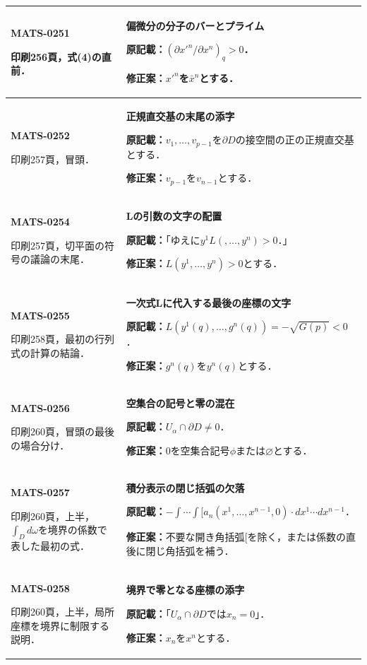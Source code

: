 \documentclass[a4paper,10pt]{ltjsarticle}
\begin{document}
\begin{longtable}{@{}>{\raggedright\arraybackslash}p{.19\linewidth}>{\raggedright\arraybackslash}p{.77\linewidth}@{}}
\hline
\hypertarget{MATS-0251}{}\textbf{MATS-0251}\par 印刷256頁，式(4)の直前． & \textbf{偏微分の分子のバーとプライム}\par\textbf{原記載：}$(\partial x'^n/\partial x^n)_q>0$．\par\textbf{修正案：}$x'^n$を$\bar x^n$とする． \\[3pt]
\hline
\hypertarget{MATS-0252}{}\textbf{MATS-0252}\par 印刷257頁，冒頭． & \textbf{正規直交基の末尾の添字}\par\textbf{原記載：}$v_1,\ldots,v_{p-1}$を$\partial D$の接空間の正の正規直交基とする．\par\textbf{修正案：}$v_{p-1}$を$v_{n-1}$とする． \\[3pt]
\hline
\hypertarget{MATS-0254}{}\textbf{MATS-0254}\par 印刷257頁，切平面の符号の議論の末尾． & \textbf{Lの引数の文字の配置}\par\textbf{原記載：}「ゆえに$y^1L(,\ldots,y^n)>0$．」\par\textbf{修正案：}$L(y^1,\ldots,y^n)>0$とする． \\[3pt]
\hline
\hypertarget{MATS-0255}{}\textbf{MATS-0255}\par 印刷258頁，最初の行列式の計算の結論． & \textbf{一次式Lに代入する最後の座標の文字}\par\textbf{原記載：}$L(y^1(q),\ldots,g^n(q))=-\sqrt{G(p)}<0$．\par\textbf{修正案：}$g^n(q)$を$y^n(q)$とする． \\[3pt]
\hline
\hypertarget{MATS-0256}{}\textbf{MATS-0256}\par 印刷260頁，冒頭の最後の場合分け． & \textbf{空集合の記号と零の混在}\par\textbf{原記載：}$U_\alpha\cap\partial D\ne0$．\par\textbf{修正案：}$0$を空集合記号$\phi$または$\varnothing$とする． \\[3pt]
\hline
\hypertarget{MATS-0257}{}\textbf{MATS-0257}\par 印刷260頁，上半，$\int_Dd\omega$を境界の係数で表した最初の式． & \textbf{積分表示の閉じ括弧の欠落}\par\textbf{原記載：}$-\int\cdots\int[a_n(x^1,\ldots,x^{n-1},0)\cdot dx^1\cdots dx^{n-1}$．\par\textbf{修正案：}不要な開き角括弧$[$を除く，または係数の直後に閉じ角括弧を補う． \\[3pt]
\hline
\hypertarget{MATS-0258}{}\textbf{MATS-0258}\par 印刷260頁，上半，局所座標を境界に制限する説明． & \textbf{境界で零となる座標の添字}\par\textbf{原記載：}「$U_\alpha\cap\partial D$では$x_n=0$」．\par\textbf{修正案：}$x_n$を$x^n$とする． \\[3pt]

\end{longtable}
\end{document}

